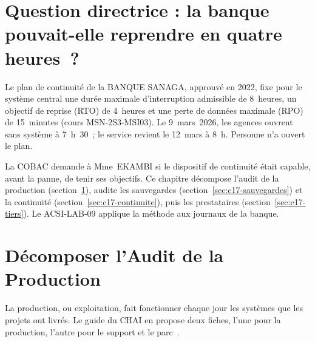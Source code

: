 \bigskip

\section*{Question directrice : la banque pouvait-elle reprendre en quatre heures~?}

Le plan de continuité de la BANQUE SANAGA, approuvé en 2022, fixe pour le
système central une durée maximale d'interruption admissible de 8~heures,
un objectif de reprise (RTO) de 4~heures et une perte de données maximale
(RPO) de 15~minutes (cours MSN-2S3-MSI03). Le 9~mars~2026, les agences
ouvrent sans système à 7~h~30~; le service revient le 12~mars à 8~h.
Personne n'a ouvert le plan.

La COBAC demande à Mme~EKAMBI si le dispositif de continuité était
capable, avant la panne, de tenir ses objectifs. Ce chapitre décompose
l'audit de la production (section~\ref{sec:c17-production}), audite les
sauvegardes (section~\ref{sec:c17-sauvegardes}) et la continuité
(section~\ref{sec:c17-continuite}), puis les prestataires
(section~\ref{sec:c17-tiers}). Le ACSI-LAB-09 applique la méthode aux journaux
de la banque.

\separateur

\section{Décomposer l'Audit de la Production}
\label{sec:c17-production}

La production, ou exploitation, fait fonctionner chaque jour les systèmes
que les projets ont livrés. Le guide du CHAI en propose deux fiches, l'une
pour la production, l'autre pour le support et le parc~\cite{chai2014guide}.

